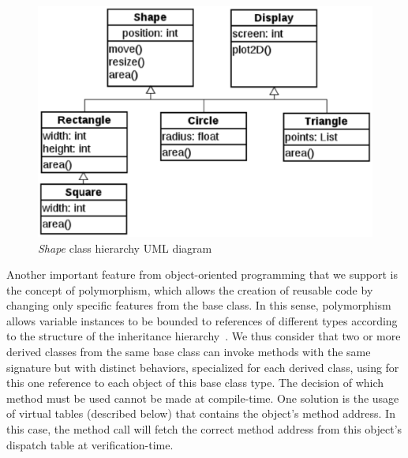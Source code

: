 \documentclass[conference]{IEEEtran}
\begin{document}
\begin{figure}[ht]
\centering
\includegraphics[scale=0.28]{figures/inheritance_uml}
\caption{\textit{Shape} class hierarchy UML diagram} 
\label{figure:uml_diagram}
\end{figure}

Another important feature from object-oriented programming that we
support is the concept of polymorphism, which allows the creation of
reusable code by changing only specific features from the base class.
In this sense, polymorphism allows variable instances to be
bounded to references of different types according to the structure of the
inheritance hierarchy~\cite{Alexander02}.
We thus consider that two or more derived classes
from the same base class can invoke methods with the same signature but 
with distinct behaviors, specialized for each derived class, using for 
this one reference to each object of this base class type. The decision 
of which method must be used cannot be made at compile-time. 
One solution is the usage of virtual tables (described below) that contains 
the object's method address. In this case, the method call will fetch the correct method 
address from this object's dispatch table at verification-time.

\end{document}
